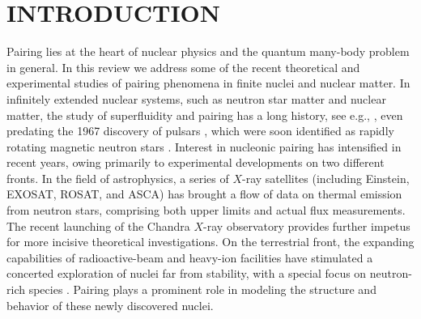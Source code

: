 \documentclass[rmp,preprint,aps,floatfix]{revtex4}
\begin{document}
\tableofcontents

\pagebreak

%
\section{INTRODUCTION}
\label{sec:introduction}

Pairing lies at the heart of nuclear physics and the quantum
many-body problem in general. In this review we address some
of the recent theoretical and experimental studies of pairing 
phenomena in finite nuclei and nuclear matter. 
In infinitely extended nuclear systems, such as neutron star matter 
and nuclear matter, 
the study of superfluidity and pairing has a 
long history, see e.g., \cite{migdal60,cms59,emerysessler}, 
even predating the 1967 discovery of pulsars \cite{hewish}, 
which were soon identified as rapidly rotating magnetic neutron 
stars \cite{gold}.  Interest in nucleonic pairing has intensified 
in recent years, owing primarily to experimental developments on two 
different fronts.  In the field of astrophysics, a series of $X$-ray 
satellites (including Einstein, EXOSAT, ROSAT, and ASCA) has brought a 
flow of data on thermal emission from neutron stars, comprising both upper 
limits and actual flux measurements.  The recent launching of the 
Chandra $X$-ray observatory provides further impetus for more incisive 
theoretical investigations.  On the terrestrial 
front, the expanding capabilities of radioactive-beam and heavy-ion 
facilities have stimulated a concerted exploration of 
nuclei far from stability, with a special focus on neutron-rich species 
\cite{riisager,mueller}.  Pairing plays a prominent role in modeling 
the structure and behavior of these newly discovered nuclei.  
\end{document}
